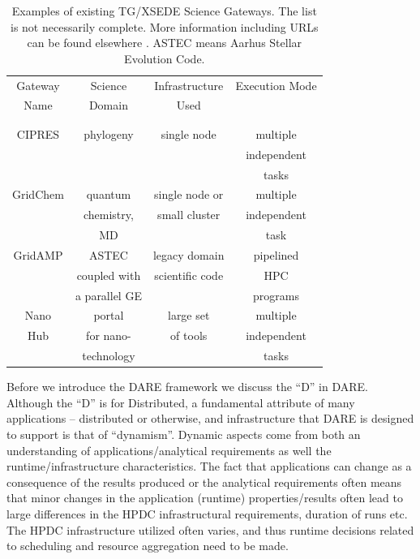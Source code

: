 \documentclass[]{svjour3}
\begin{document}
\begin{table}
\centering
 \small
\begin{tabular}{|c|c|c|c|} 
  \hline Gateway  & Science & Infrastructure & Execution Mode 
  \\
  Name & Domain & Used & \\ 
  &  &  & \\
  & & & \\  \hline \hline 
  
  CIPRES   & phylogeny  &  single node  & multiple  \\
   &  &   & independent   \\ 
  &  &  &  tasks \\  \hline
  GridChem   & quantum & single node or     & multiple  \\
     & chemistry, & small cluster & independent   \\
  & MD &  & task  \\ \hline
   GridAMP     & ASTEC  & legacy domain  & pipelined \\ 
  & coupled with  &  scientific code   & HPC  \\
  & a parallel GE &   &  programs \\ \hline
  Nano  & portal  & large set   & multiple \\
  Hub  & for nano- & of tools  & independent \\
   & technology &  & tasks \\ \hline
  \hline
\end{tabular} \caption{Examples of existing TG/XSEDE Science Gateways. The list is not necessarily complete. More information including URLs can be found elsewhere \cite{tg-sg-list-url}. ASTEC means Aarhus Stellar Evolution Code.}
 \label{table:TG-sg} 
\end{table}

Before we introduce the DARE framework we discuss the ``D'' in
DARE. Although the ``D'' is for Distributed, a fundamental attribute
of many applications -- distributed or otherwise, and infrastructure
that DARE is designed to support is that of ``dynamism''.  Dynamic
aspects come from both an understanding of applications/analytical
requirements as well the runtime/infrastructure characteristics.  The
fact that applications can change as a consequence of the results
produced or the analytical requirements often means that minor changes
in the application (runtime) properties/results often lead to large
differences in the HPDC infrastructural requirements, duration of runs
etc. The HPDC infrastructure utilized often varies, and thus runtime
decisions related to scheduling and resource aggregation need to be made.
\end{document}
